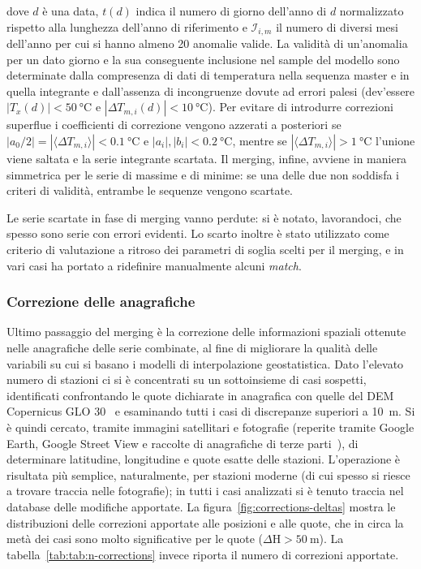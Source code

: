 dove \(d\) è una data, \(t(d)\) indica il numero di giorno dell'anno di \(d\) normalizzato rispetto alla lunghezza dell'anno di riferimento e \(\mathcal{I}_{i,m}\) il numero di diversi mesi dell'anno per cui si hanno almeno 20 anomalie valide. La validità di un'anomalia per un dato giorno e la sua conseguente inclusione nel sample del modello sono determinate dalla compresenza di dati di temperatura nella sequenza master e in quella integrante e dall'assenza di incongruenze dovute ad errori palesi (dev'essere \(|T_x(d)| < \qty{50}{\degreeCelsius}\) e \(|\Delta T_{m,i}(d)| < \qty{10}{\degreeCelsius}\)). Per evitare di introdurre correzioni superflue i coefficienti di correzione vengono azzerati a posteriori se \(|a_0/2| = |\langle \Delta T_{m,i} \rangle| < \qty{0.1}{\degreeCelsius}\) e \(|a_i|, |b_i| < \qty{0.2}{\degreeCelsius}\), mentre se \(|\langle \Delta T_{m,i} \rangle| > \qty{1}{\degreeCelsius}\) l'unione viene saltata e la serie integrante scartata. Il merging, infine, avviene in maniera simmetrica per le serie di massime e di minime: se una delle due non soddisfa i criteri di validità, entrambe le sequenze vengono scartate.

Le serie scartate in fase di merging vanno perdute: si è notato, lavorandoci, che spesso sono serie con errori evidenti. Lo scarto inoltre è stato utilizzato come criterio di valutazione a ritroso dei parametri di soglia scelti per il merging, e in vari casi ha portato a ridefinire manualmente alcuni \emph{match}.

\subsubsection{Correzione delle anagrafiche}
Ultimo passaggio del merging è la correzione delle informazioni spaziali ottenute nelle anagrafiche delle serie combinate, al fine di migliorare la qualità delle variabili su cui si basano i modelli di interpolazione geostatistica. Dato l'elevato numero di stazioni ci si è concentrati su un sottoinsieme di casi sospetti, identificati confrontando le quote dichiarate in anagrafica con quelle del DEM Copernicus GLO 30~\cite{europeanspaceagencyCopernicusGlobalEuropean2022} e esaminando tutti i casi di discrepanze superiori a \qty{10}{\meter}. Si è quindi cercato, tramite immagini satellitari e fotografie (reperite tramite Google Earth, Google Street View e raccolte di anagrafiche di terze parti~\cite{associazionelineameteoStazioniReteLinea}), di determinare latitudine, longitudine e quote esatte delle stazioni. L'operazione è risultata più semplice, naturalmente, per stazioni moderne (di cui spesso si riesce a trovare traccia nelle fotografie); in tutti i casi analizzati si è tenuto traccia nel database delle modifiche apportate. La figura~\ref{fig:corrections-deltas} mostra le distribuzioni delle correzioni apportate alle posizioni e alle quote, che in circa la metà dei casi sono molto significative per le quote (\(\Delta \mathrm{H} > \qty{50}{\meter}\)). La tabella~\ref{tab:tab:n-corrections} invece riporta il numero di correzioni apportate.

